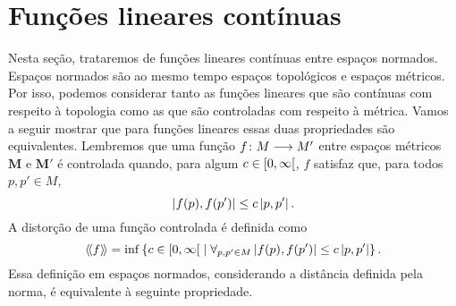 \section{Funções lineares contínuas}


Nesta seção, trataremos de funções lineares contínuas entre espaços normados. Espaços normados são ao mesmo tempo espaços topológicos e espaços métricos. Por isso, podemos considerar tanto as funções lineares que são contínuas com respeito à topologia como as que são controladas com respeito à métrica. Vamos a seguir mostrar que para funções lineares essas duas propriedades são equivalentes. Lembremos que uma função $f\colon \allowbreak M \longrightarrow M'$ entre espaços métricos $\bm M$ e $\bm M'$ é controlada quando, para algum $c \in \left[0,\allowbreak \infty\right[$, $f$ satisfaz que, para todos $p,p' \in M$,
	\begin{equation*}
	\left\vert{f(p)},{f(p')}\right\vert \leq c\left\vert{p},{p'}\right\vert.
	\end{equation*}
A distorção de uma função controlada é definida como
	\begin{equation*}
	\langle\!\langle{f}\rangle\!\rangle = \inf\left\{ c \in \left[0,\allowbreak \infty\right[ \;\middle\vert\; \forall_{p,p' \in M} \left\vert{f(p)},{f(p')}\right\vert \leq c\left\vert{p},{p'}\right\vert \right\}.
	\end{equation*}
Essa definição em espaços normados, considerando a distância definida pela norma, é equivalente à seguinte propriedade.



